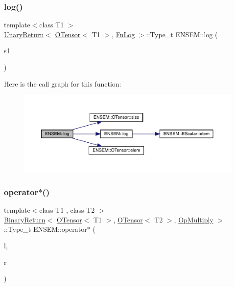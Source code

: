 \subsubsection{\texorpdfstring{log()}{log()}}
{\footnotesize\ttfamily template$<$class T1 $>$ \\
\mbox{\hyperlink{structENSEM_1_1UnaryReturn}{Unary\+Return}}$<$ \mbox{\hyperlink{classENSEM_1_1OTensor}{O\+Tensor}}$<$ T1 $>$, \mbox{\hyperlink{structENSEM_1_1FnLog}{Fn\+Log}} $>$\+::Type\+\_\+t E\+N\+S\+E\+M\+::log (\begin{DoxyParamCaption}\item[{const \mbox{\hyperlink{classENSEM_1_1OTensor}{O\+Tensor}}$<$ T1 $>$ \&}]{s1 }\end{DoxyParamCaption})\hspace{0.3cm}{\ttfamily [inline]}}

Here is the call graph for this function\+:\nopagebreak
\begin{figure}[H]
\begin{center}
\leavevmode
\includegraphics[width=350pt]{de/d87/group__obstensor_ga256d486f79c6bee5428762a951322949_cgraph}
\end{center}
\end{figure}
\mbox{\label{group__obstensor_ga45559bd4234015a910a92c2eb80a69d5}} 
\subsubsection{\texorpdfstring{operator$\ast$()}{operator*()}\hspace{0.1cm}{\footnotesize\ttfamily [1/3]}}
{\footnotesize\ttfamily template$<$class T1 , class T2 $>$ \\
\mbox{\hyperlink{structENSEM_1_1BinaryReturn}{Binary\+Return}}$<$ \mbox{\hyperlink{classENSEM_1_1OTensor}{O\+Tensor}}$<$ T1 $>$, \mbox{\hyperlink{classENSEM_1_1OTensor}{O\+Tensor}}$<$ T2 $>$, \mbox{\hyperlink{structENSEM_1_1OpMultiply}{Op\+Multiply}} $>$\+::Type\+\_\+t E\+N\+S\+E\+M\+::operator$\ast$ (\begin{DoxyParamCaption}\item[{const \mbox{\hyperlink{classENSEM_1_1OTensor}{O\+Tensor}}$<$ T1 $>$ \&}]{l,  }\item[{const \mbox{\hyperlink{classENSEM_1_1OTensor}{O\+Tensor}}$<$ T2 $>$ \&}]{r }\end{DoxyParamCaption})\hspace{0.3cm}{\ttfamily [inline]}}



